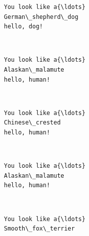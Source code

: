\documentclass[11pt]{article}
\begin{document}
    \begin{Verbatim}[commandchars=\\\{\}]
You look like a{\ldots}
German\_shepherd\_dog
hello, dog!

    \end{Verbatim}

    \begin{center}
    \end{center}
    { \hspace*{\fill} \\}
    
    \begin{Verbatim}[commandchars=\\\{\}]
You look like a{\ldots}
Alaskan\_malamute
hello, human!

    \end{Verbatim}

    \begin{center}
    \end{center}
    { \hspace*{\fill} \\}
    
    \begin{Verbatim}[commandchars=\\\{\}]
You look like a{\ldots}
Chinese\_crested
hello, human!

    \end{Verbatim}

    \begin{center}
    \end{center}
    { \hspace*{\fill} \\}
    
    \begin{Verbatim}[commandchars=\\\{\}]
You look like a{\ldots}
Alaskan\_malamute
hello, human!

    \end{Verbatim}

    \begin{center}
    \end{center}
    { \hspace*{\fill} \\}
    
    \begin{Verbatim}[commandchars=\\\{\}]
You look like a{\ldots}
Smooth\_fox\_terrier

    \end{Verbatim}


    
    
    
    
\end{document}
